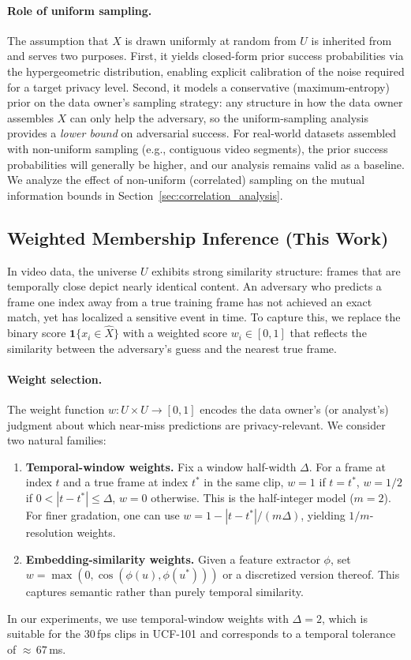 \documentclass[letterpaper]{article} %
\begin{document}
\paragraph{Role of uniform sampling.}
The assumption that $X$ is drawn uniformly at random from $U$ is inherited from~\cite{xiao2024formal} and serves two purposes. First, it yields closed-form prior success probabilities via the hypergeometric distribution, enabling explicit calibration of the noise required for a target privacy level. Second, it models a conservative (maximum-entropy) prior on the data owner's sampling strategy: any structure in how the data owner assembles $X$ can only help the adversary, so the uniform-sampling analysis provides a \emph{lower bound} on adversarial success. For real-world datasets assembled with non-uniform sampling (e.g., contiguous video segments), the prior success probabilities will generally be higher, and our analysis remains valid as a baseline. We analyze the effect of non-uniform (correlated) sampling on the mutual information bounds in Section~\ref{sec:correlation_analysis}.

\subsection{Weighted Membership Inference (This Work)}

In video data, the universe $U$ exhibits strong similarity structure: frames that are temporally close depict nearly identical content. An adversary who predicts a frame one index away from a true training frame has not achieved an exact match, yet has localized a sensitive event in time. To capture this, we replace the binary score $\mathbf{1}\{x_i \in \hat{X}\}$ with a weighted score $w_i \in [0,1]$ that reflects the similarity between the adversary's guess and the nearest true frame.

\paragraph{Weight selection.}
\label{par:weight_selection}
The weight function $w : U \times U \to [0,1]$ encodes the data owner's (or analyst's) judgment about which near-miss predictions are privacy-relevant. We consider two natural families:
\begin{enumerate}[leftmargin=*]
\item \textbf{Temporal-window weights.}  Fix a window half-width $\Delta$. For a frame at index $t$ and a true frame at index $t^*$ in the same clip, $w = 1$ if $t = t^*$, $w = 1/2$ if $0 < |t - t^*| \le \Delta$, $w = 0$ otherwise. This is the half-integer model ($m{=}2$). For finer gradation, one can use $w = 1 - |t - t^*|/(m\Delta)$, yielding $1/m$-resolution weights.
\item \textbf{Embedding-similarity weights.} Given a feature extractor $\phi$, set $w = \max(0, \cos(\phi(u), \phi(u^*)))$ or a discretized version thereof. This captures semantic rather than purely temporal similarity.
\end{enumerate}
In our experiments, we use temporal-window weights with $\Delta = 2$, which is suitable for the 30\,fps clips in UCF-101 and corresponds to a temporal tolerance of ${\approx}\,67$\,ms.
\end{document}
